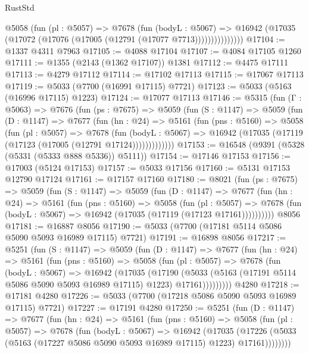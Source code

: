 \begin{lexlean}{RustStd}
\begin{coremodule}
                @5058
                  (fun (pl : @5057) =>
                  @7678
                    (fun (bodyL : @5067) =>
                    @16942 (@17035 (@17072 (@17076 (@17005 (@12791 (@17077 @7713)))))))))))))))
@17104 := @1337 @4311 @7963
@17105 := @4088 @17104
@17107 := @4084 @17105 @1260
@17111 := @1355 (@2143 (@1362 @17107)) @1381
@17112 := @4475 @17111
@17113 := @4279 @17112
@17114 := @17102 @17113
@17115 := @17067 @17113
@17119 := @5033 (@7700 (@16991 @17115) @7721)
@17123 := @5033 (@5163 (@16996 @17115) @1223)
@17124 := @17077 @17113
@17146 := @5315
    (fun (Γ : @5063) =>
    @7676
      (fun (ps : @7675) =>
      @5059
        (fun (S : @1147) =>
        @5059
          (fun (D : @1147) =>
          @7677
            (fun (hn : @24) =>
            @5161
              (fun (pns : @5160) =>
              @5058
                (fun (pl : @5057) =>
                @7678
                  (fun (bodyL : @5067) =>
                  @16942 (@17035 (@17119 (@17123 (@17005 (@12791 @17124)))))))))))))
@17153 := @16548 (@9391 (@5328 (@5331 (@5333 @888 @5336)) @5111))
@17154 := @17146 @17153
@17156 := @17003 (@5124 @17153)
@17157 := @5033 @17156
@17160 := @5131 @17153 @12790 @17124
@17161 := @17157 @17160
@17180 := @8021
    (fun (ps : @7675) =>
    @5059
      (fun (S : @1147) =>
      @5059
        (fun (D : @1147) =>
        @7677
          (fun (hn : @24) =>
          @5161
            (fun (pns : @5160) =>
            @5058
              (fun (pl : @5057) =>
              @7678 (fun (bodyL : @5067) => @16942 (@17035 (@17119 (@17123 @17161))))))))))
    @8056
@17181 := @16887 @8056
@17190 := @5033 (@7700 (@17181 @5114 @5086 @5090 @5093 @16989 @17115) @7721)
@17191 := @16898 @8056
@17217 := @5251
    (fun (S : @1147) =>
    @5059
      (fun (D : @1147) =>
      @7677
        (fun (hn : @24) =>
        @5161
          (fun (pns : @5160) =>
          @5058
            (fun (pl : @5057) =>
            @7678
              (fun (bodyL : @5067) =>
              @16942
                (@17035
                  (@17190
                    (@5033
                      (@5163 (@17191 @5114 @5086 @5090 @5093 @16989 @17115) @1223)
                      @17161)))))))))
    @4280
@17218 := @17181 @4280
@17226 := @5033 (@7700 (@17218 @5086 @5090 @5093 @16989 @17115) @7721)
@17227 := @17191 @4280
@17250 := @5251
    (fun (D : @1147) =>
    @7677
      (fun (hn : @24) =>
      @5161
        (fun (pns : @5160) =>
        @5058
          (fun (pl : @5057) =>
          @7678
            (fun (bodyL : @5067) =>
            @16942
              (@17035
                (@17226 (@5033 (@5163 (@17227 @5086 @5090 @5093 @16989 @17115) @1223) @17161))))))))

\end{coremodule}
\end{lexlean}
